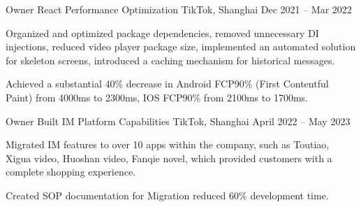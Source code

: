 \begin{cventries}
\cventry
    {Owner} %
    {React Performance Optimization} %
    {TikTok, Shanghai} %
    {Dec 2021 – Mar 2022} %
    {
      \begin{cvitems} %
        \item Organized and optimized package dependencies, removed unnecessary DI injections, reduced video player package size, implemented an automated solution for skeleton screens, introduced a caching mechanism for historical messages. 
        \item Achieved a substantial 40\% decrease in Android FCP90\% (First Contentful Paint) from 4000ms to 2300ms, IOS FCP90\% from 2100ms to 1700ms.
      \end{cvitems}
    }



\cventry
    {Owner} %
    {Built IM Platform Capabilities} %
    {TikTok, Shanghai} %
    {April 2022 – May 2023} %
    {
      \begin{cvitems} %
        \item Migrated IM features to over 10 apps within the company, such as Toutiao, Xigua video, Huoshan video, Fanqie novel, which provided customers with a complete shopping experience.
        \item Created SOP documentation for Migration reduced 60\% development time.
      \end{cvitems}
    }






\end{cventries}
